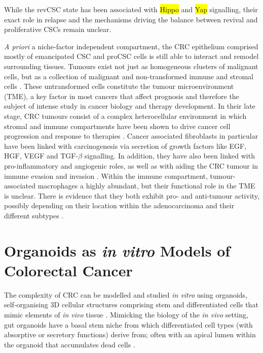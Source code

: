 While the revCSC state has been associated with \colorbox{yellow}{Hippo} and \colorbox{yellow}{Yap} signalling, their exact role in relapse and the mechanisms driving the balance between revival and proliferative CSCs remain unclear.

\emph{A priori} a niche-factor independent compartment, the CRC epithelium comprised mostly of emancipated CSC and proCSC cells is still able to interact and remodel surrounding tissues.
Tumours exist not just as homogeneous clusters of malignant cells, but as a collection of malignant and non-transformed immune and stromal cells \cite{balkwill_tumor_2012}. These untransformed cells constitute the tumour microenvironment (TME), a key factor in most cancers that affect prognosis \cite{calon_stromal_2015} and therefore the subject of intense study in cancer biology and therapy development. 
In their late stage, CRC tumours consist of a complex heterocellular environment in which stromal and immune compartments have been shown to drive cancer cell progression \cite{peddareddigari_tumor_2010,isella_stromal_2015} and response to therapies \cite{tape_heterocellular_2017, toor_immune_2019}.
Cancer associated fibroblasts in particular have been linked with carcinogenesis via secretion of growth factors like EGF, HGF, VEGF and TGF-$\beta$ signalling. In addition, they have also been linked with pro-inflammatory and angiogenic roles, as well as with aiding the CRC tumour in immune evasion and invasion \cite{karagiannis_cancer-associated_2012}.
Within the immune compartment, tumour-associated macrophages a highly abundant, but their functional role in the TME is unclear. There is evidence that they both exhibit pro- and anti-tumour activity, possibly depending on their location within the adenocarcinoma and their different subtypes \cite{martinez_m1_2014}. 


\section{Organoids as \textit{in vitro} Models of Colorectal Cancer}

The complexity of CRC can be modelled and studied \emph{in vitro} using organoids, self-organising 3D cellular structures comprising stem and differentiated cells that mimic elements of \emph{in vivo} tissue \cite{huch_modeling_2015,lancaster_disease_2019,almeqdadi_gut_2019}. Mimicking the biology of the \emph{in vivo} setting, gut organoids have a basal stem niche from which differentiated cell types (with absorptive or secretory functions) derive from; often with an apical lumen within the organoid that accumulates dead cells \cite{sato_single_2009}.

